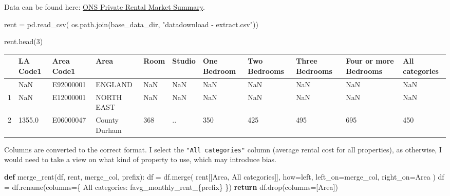 \documentclass[
  number]{elsarticle}
\newenvironment{Shaded}{\begin{snugshade}}{\end{snugshade}}
\newcommand{\ControlFlowTok}[1]{\textcolor[rgb]{0.00,0.23,0.31}{\textbf{#1}}}
\newcommand{\DecValTok}[1]{\textcolor[rgb]{0.68,0.00,0.00}{#1}}
\newcommand{\KeywordTok}[1]{\textcolor[rgb]{0.00,0.23,0.31}{\textbf{#1}}}
\newcommand{\NormalTok}[1]{\textcolor[rgb]{0.00,0.23,0.31}{#1}}
\newcommand{\OperatorTok}[1]{\textcolor[rgb]{0.37,0.37,0.37}{#1}}
\newcommand{\SpecialCharTok}[1]{\textcolor[rgb]{0.37,0.37,0.37}{#1}}
\newcommand{\SpecialStringTok}[1]{\textcolor[rgb]{0.13,0.47,0.30}{#1}}
\newcommand{\StringTok}[1]{\textcolor[rgb]{0.13,0.47,0.30}{#1}}
\begin{document}
Data can be found here:
\href{https://www.ons.gov.uk/peoplepopulationandcommunity/housing/bulletins/privaterentalmarketsummarystatisticsinengland/october2018toseptember2019}{ONS
Private Rental Market Summary}.

\begin{Shaded}
\begin{Highlighting}[]
\NormalTok{rent }\OperatorTok{=}\NormalTok{ pd.read\_csv(}
\NormalTok{    os.path.join(base\_data\_dir, }\StringTok{"datadownload {-} extract.csv"}\NormalTok{))}

\NormalTok{rent.head(}\DecValTok{3}\NormalTok{)}
\end{Highlighting}
\end{Shaded}

\begin{longtable}[]{@{}lllllllllll@{}}
\toprule\noalign{}
& LA Code1 & Area Code1 & Area & Room & Studio & One Bedroom & Two
Bedrooms & Three Bedrooms & Four or more Bedrooms & All categories \\
\midrule\noalign{}
\endhead
\bottomrule\noalign{}
\endlastfoot
0 & NaN & E92000001 & ENGLAND & NaN & NaN & NaN & NaN & NaN & NaN &
NaN \\
1 & NaN & E12000001 & NORTH EAST & NaN & NaN & NaN & NaN & NaN & NaN &
NaN \\
2 & 1355.0 & E06000047 & County Durham & 368 & .. & 350 & 425 & 495 &
695 & 450 \\
\end{longtable}

Columns are converted to the correct format. I select the
\texttt{"All\ categories"} column (average rental cost for all
properties), as otherwise, I would need to take a view on what kind of
property to use, which may introduce bias.

\begin{Shaded}
\begin{Highlighting}[]
\KeywordTok{def}\NormalTok{ merge\_rent(df, rent, merge\_col, prefix):}
\NormalTok{    df }\OperatorTok{=}\NormalTok{ df.merge(}
\NormalTok{        rent[[}\StringTok{\textquotesingle{}Area\textquotesingle{}}\NormalTok{, }\StringTok{\textquotesingle{}All categories\textquotesingle{}}\NormalTok{]],}
\NormalTok{        how}\OperatorTok{=}\StringTok{\textquotesingle{}left\textquotesingle{}}\NormalTok{,}
\NormalTok{        left\_on}\OperatorTok{=}\NormalTok{merge\_col,}
\NormalTok{        right\_on}\OperatorTok{=}\StringTok{\textquotesingle{}Area\textquotesingle{}}
\NormalTok{    )}
\NormalTok{    df }\OperatorTok{=}\NormalTok{ df.rename(columns}\OperatorTok{=}\NormalTok{\{}
        \StringTok{\textquotesingle{}All categories\textquotesingle{}}\NormalTok{: }\SpecialStringTok{f\textquotesingle{}avg\_monthly\_rent\_}\SpecialCharTok{\{}\NormalTok{prefix}\SpecialCharTok{\}}\SpecialStringTok{\textquotesingle{}}
\NormalTok{    \})}
    \ControlFlowTok{return}\NormalTok{ df.drop(columns}\OperatorTok{=}\NormalTok{[}\StringTok{\textquotesingle{}Area\textquotesingle{}}\NormalTok{])}
\end{Highlighting}
\end{Shaded}
\end{document}
